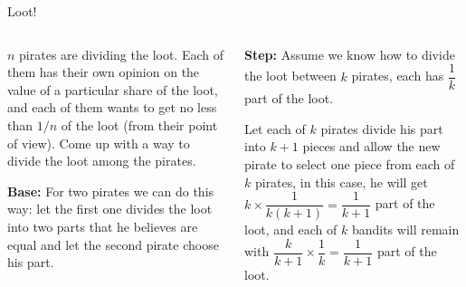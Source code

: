 \documentclass[9pt,aspectratio=169,handout]{beamer}
\begin{document}
\begin{frame}{Loot!}
  \begin{columns}[T]
    \begin{column}{0.5\textwidth}
      \begin{problem}
        $n$ pirates are dividing the loot. Each of them has their own opinion on the value of a particular share of the loot, and each of them wants to get no less than $1/n$ of the loot (from their point of view). Come up with a way to divide the loot among the pirates.
      \end{problem}\pause
      \textbf{Base:} For two pirates we can do this way: let the first one divides the loot into two parts that he believes are equal and let the second pirate choose his part.\pause

    \end{column}
    \begin{column}{0.5\textwidth}
      
      \textbf{Step:} Assume we know how to divide the loot between $k$ pirates, each has $\dfrac{1}{k}$ part of the loot.\pause

      Let each of $k$ pirates divide his part into $k+1$ pieces and allow the new pirate to select one piece from each of $k$ pirates, in this case, he will get $k \times \dfrac{1}{k (k + 1)} = \dfrac{1}{k+1}$ part of the loot, and each of $k$ bandits will remain with $\dfrac{k}{k+1}  \times \dfrac{1}{k} = \dfrac{1}{k+1}$ part of the loot. 
    \end{column}
  \end{columns}
\end{frame}
\end{document}
